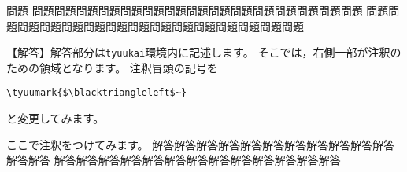 {\tyuumark{$\blacktriangleleft$~}
\begin{itembox}{問題}
問題問題問題問題問題問題問題問題問題問題問題問題問題問題問題
問題問題問題問題問題問題問題問題問題問題問題問題問題問題問題
\end{itembox}
\begin{tyuukai}
【解答】解答部分は\verb+tyuukai+環境内に記述します。
そこでは，右側一部が注釈のための領域となります。
注釈冒頭の記号を
\begin{jquote}
\begin{verbatim}
\tyuumark{$\blacktriangleleft$~}
\end{verbatim}
\end{jquote}
と変更してみます。

ここで注釈をつけてみます。
解答解答解答解答解答解答解答解答解答解答解答解答解答
解答解答解答解答解答解答解答解答解答解答解答解答解答
\end{tyuukai}}
